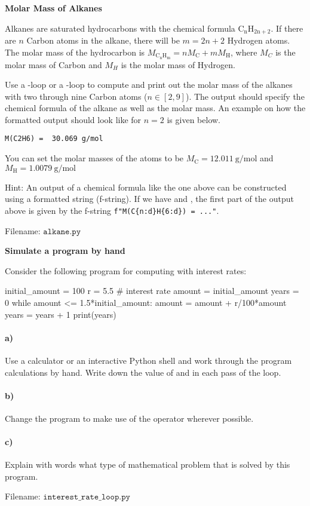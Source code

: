 \begin{Problem}{\textbf{Molar Mass of Alkanes}}

\noindent
Alkanes are saturated hydrocarbons with the chemical formula $\mathrm{C_nH_{2n+2}}$. If there are $n$ Carbon atoms in the alkane, there will be $m = 2n+2$ Hydrogen atoms. The molar mass of the hydrocarbon is $M_{\mathrm{C_n H_{m}}} = n M_{\mathrm{C}} + m M_{\mathrm{H}} $, where $M_C$ is the molar mass of Carbon and $M_H$ is the molar mass of Hydrogen.

Use a -loop or a -loop to compute and print out the molar mass of the alkanes with two through nine Carbon atoms ($n \in [2, 9]$). The output should specify the chemical formula of the alkane as well as the molar mass. An example on how the formatted output should look like for $n = 2$ is given below.
\begin{lstlisting}
M(C2H6) =  30.069 g/mol
\end{lstlisting}
You can set the molar masses of the atoms to be $M_{\mathrm{C}} = 12.011 \ \mathrm{g/mol}$ and $M_{\mathrm{H}}  = 1.0079 \ \mathrm{g/mol}$

Hint: An output of a chemical formula like the one above can be constructed using a formatted string (f-string). If we have  and
, the first part of the output above is given by the f-string \verb!f"M(C{n:d}H{6:d}) = ..."!.

Filename: $\texttt{alkane.py}$
\end{Problem}


\begin{Problem}{\textbf{Simulate a program by hand}}\label{interest_rate_loop}

\noindent Consider the following program for computing with interest rates:
\begin{python}
initial_amount = 100
r = 5.5 # interest rate
amount = initial_amount
years = 0
while amount <= 1.5*initial_amount:
    amount = amount + r/100*amount
    years = years + 1
print(years)
\end{python}

\paragraph{a)} Use a calculator or an interactive Python shell and work through the
program calculations by hand. Write down the value of  and 
in each pass of the loop.
\paragraph{b)} Change the program to make use of the operator \py{+=} wherever possible.
\paragraph{c)} Explain with words what type of mathematical problem that is solved by this
program.

Filename: $\texttt{interest\_rate\_loop.py}$
\end{Problem}


